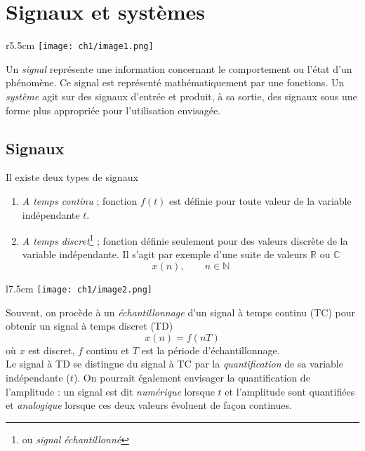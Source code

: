\chapter{Signaux et systèmes}
\begin{wrapfigure}[5]{r}{5.5cm}
\vspace{-5mm}
\texttt{[image: ch1/image1.png]}
\end{wrapfigure}
Un \textit{signal} représente une information concernant le comportement ou l'état 
d'un phénomène. Ce signal est représenté mathématiquement par une fonctions. Un 
\textit{système} agit sur des signaux d’entrée et produit, à sa sortie, des signaux 
sous une forme plus appropriée pour l’utilisation envisagée.

\section{Signaux}
Il existe deux types de signaux
\begin{enumerate}
\item \textit{A temps continu} ; fonction $f(t)$ est définie pour toute valeur de 
la variable indépendante $t$.
\item \textit{A temps discret}\footnote{ou \textit{signal échantillonné}} ; fonction 
définie seulement pour des valeurs discrète de la variable indépendante. Il s'agit 
par exemple d'une suite de valeurs $\mathbb{R}$ ou $\mathbb{C}$ 
\begin{equation}
x(n),\qquad n \in\mathbb{N}
\end{equation}
\end{enumerate}

\begin{wrapfigure}[8]{l}{7.5cm}
\vspace{-10mm}
\texttt{[image: ch1/image2.png]}
\end{wrapfigure}
Souvent, on procède à un \textit{échantillonnage} d'un signal à temps continu (TC) pour 
obtenir un signal à temps discret (TD) 
\begin{equation}
x(n) = f(nT)
\end{equation}
où $x$ est discret, $f$ continu et $T$ est la période d’échantillonnage.\\

Le signal à TD se distingue du signal à TC par la \textit{quantification} de sa variable 
indépendante ($t$). On pourrait également envisager la quantification de l'amplitude : un 
signal est dit \textit{numérique} lorsque $t$ et l'amplitude sont quantifiées et 
\textit{analogique} lorsque ces deux valeurs évoluent de façon continues.

